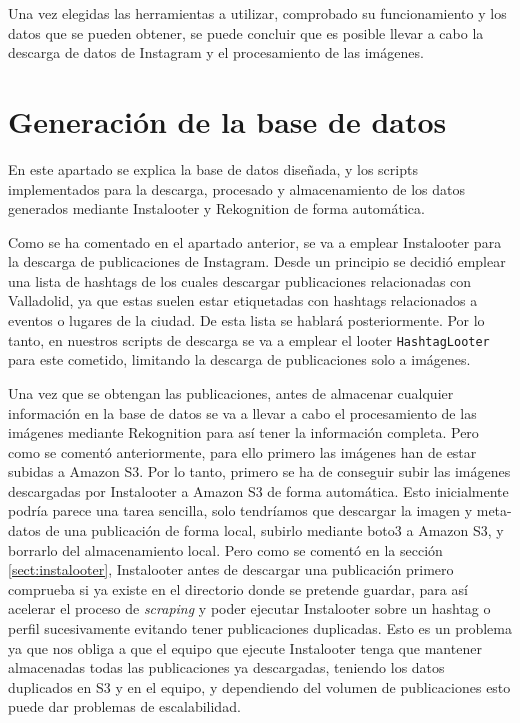 Una vez elegidas las herramientas a utilizar, comprobado su funcionamiento y los datos que se pueden obtener, se puede concluir que es posible llevar a cabo la descarga de datos de Instagram y el procesamiento de las imágenes.

\section{Generación de la base de datos}

En este apartado se explica la base de datos diseñada, y los scripts implementados para la descarga, procesado y almacenamiento de los datos generados mediante Instalooter y Rekognition de forma automática.

Como se ha comentado en el apartado anterior, se va a emplear Instalooter para la descarga de publicaciones de Instagram. Desde un principio se decidió emplear una lista de hashtags de los cuales descargar publicaciones relacionadas con Valladolid, ya que estas suelen estar etiquetadas con hashtags relacionados a eventos o lugares de la ciudad. De esta lista se hablará posteriormente. Por lo tanto, en nuestros scripts de descarga se va a emplear el looter \texttt{HashtagLooter} para este cometido, limitando la descarga de publicaciones solo a imágenes.

Una vez que se obtengan las publicaciones, antes de almacenar cualquier información en la base de datos se va a llevar a cabo el procesamiento de las imágenes mediante Rekognition para así tener la información completa. Pero como se comentó anteriormente, para ello primero las imágenes han de estar subidas a Amazon S3. Por lo tanto, primero se ha de conseguir subir las imágenes descargadas por Instalooter a Amazon S3 de forma automática. Esto inicialmente podría parece una tarea sencilla, solo tendríamos que descargar la imagen y meta-datos de una publicación de forma local, subirlo mediante boto3 a Amazon S3, y borrarlo del almacenamiento local. Pero como se comentó en la sección \ref{sect:instalooter}, Instalooter antes de descargar una publicación primero comprueba si ya existe en el directorio donde se pretende guardar, para así acelerar el proceso de \textit{scraping} y poder ejecutar Instalooter sobre un hashtag o perfil sucesivamente evitando tener publicaciones duplicadas. Esto es un problema ya que nos obliga a que el equipo que ejecute Instalooter tenga que mantener almacenadas todas las publicaciones ya descargadas, teniendo los datos duplicados en S3 y en el equipo, y dependiendo del volumen de publicaciones esto puede dar problemas de escalabilidad.

